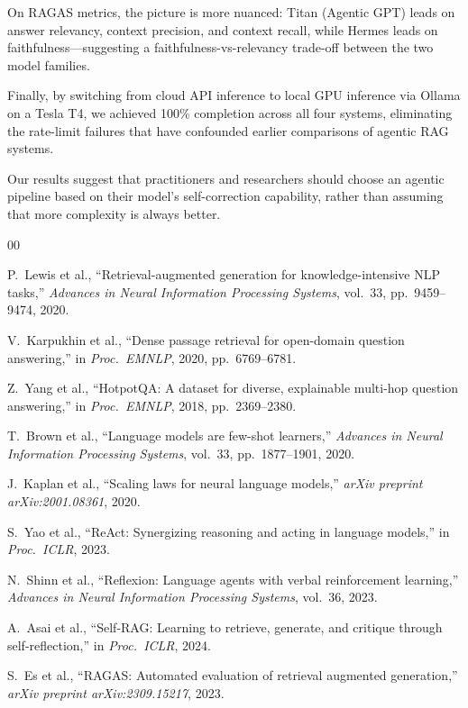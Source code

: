 \documentclass[12pt]{article}
\begin{document}
On RAGAS metrics, the picture is more nuanced: Titan (Agentic GPT) leads on
answer relevancy, context precision, and context recall, while Hermes leads
on faithfulness---suggesting a faithfulness-vs-relevancy trade-off between
the two model families.

Finally, by switching from cloud API inference to local GPU inference via
Ollama on a Tesla T4, we achieved 100\% completion across all four systems,
eliminating the rate-limit failures that have confounded earlier comparisons
of agentic RAG systems.

Our results suggest that practitioners and researchers should choose an agentic
pipeline based on their model's self-correction capability, rather than assuming
that more complexity is always better.

\begin{thebibliography}{00}

P.\ Lewis et al., ``Retrieval-augmented generation for knowledge-intensive NLP
tasks,'' \textit{Advances in Neural Information Processing Systems}, vol.~33,
pp.~9459--9474, 2020.

V.\ Karpukhin et al., ``Dense passage retrieval for open-domain question
answering,'' in \textit{Proc.\ EMNLP}, 2020, pp.~6769--6781.

Z.\ Yang et al., ``HotpotQA: A dataset for diverse, explainable multi-hop
question answering,'' in \textit{Proc.\ EMNLP}, 2018, pp.~2369--2380.

T.\ Brown et al., ``Language models are few-shot learners,''
\textit{Advances in Neural Information Processing Systems}, vol.~33,
pp.~1877--1901, 2020.

J.\ Kaplan et al., ``Scaling laws for neural language models,''
\textit{arXiv preprint arXiv:2001.08361}, 2020.

S.\ Yao et al., ``ReAct: Synergizing reasoning and acting in language models,''
in \textit{Proc.\ ICLR}, 2023.

N.\ Shinn et al., ``Reflexion: Language agents with verbal reinforcement
learning,'' \textit{Advances in Neural Information Processing Systems},
vol.~36, 2023.

A.\ Asai et al., ``Self-RAG: Learning to retrieve, generate, and critique
through self-reflection,'' in \textit{Proc.\ ICLR}, 2024.

S.\ Es et al., ``RAGAS: Automated evaluation of retrieval augmented
generation,'' \textit{arXiv preprint arXiv:2309.15217}, 2023.

\end{thebibliography}
\end{document}

